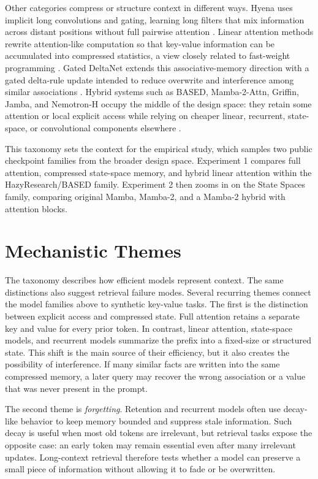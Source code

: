 \documentclass[10pt]{article}
\begin{document}
Other categories compress or structure context in different ways. Hyena uses
implicit long convolutions and gating, learning long filters that mix
information across distant positions without full pairwise attention
\cite{poli2023hyena}. Linear attention methods rewrite attention-like
computation so that key-value information can be accumulated into compressed
statistics, a view closely related to fast-weight programming
\cite{schlag2021fastweight}. Gated DeltaNet extends this associative-memory
direction with a gated delta-rule update intended to reduce overwrite and
interference among similar associations \cite{yang2024gateddelta}. Hybrid
systems such as BASED, Mamba-2-Attn, Griffin, Jamba, and Nemotron-H occupy the
middle of the design space: they retain some attention or local explicit
access while relying on cheaper linear, recurrent, state-space, or
convolutional components elsewhere
\cite{arora2024based,dao2024mamba2,de2024griffin,lieber2024jamba,nvidia2025nemotron}.

This taxonomy sets the context for the empirical study, which samples two
public checkpoint families from the broader design space. Experiment 1 compares
full attention, compressed state-space memory, and hybrid linear attention
within the HazyResearch/BASED family. Experiment 2 then zooms in on the State
Spaces family, comparing original Mamba, Mamba-2, and a Mamba-2 hybrid with
attention blocks.

\FloatBarrier
\section{Mechanistic Themes}
 
The taxonomy describes how efficient models represent context. The same
distinctions also suggest retrieval failure modes. Several recurring themes
connect the model families above to synthetic key-value tasks. The first
is the distinction between explicit access and compressed state. Full attention
retains a separate key and value for every prior token. In contrast, linear
attention, state-space models, and recurrent models summarize the prefix into a
fixed-size or structured state. This shift is the main source of their
efficiency, but it also creates the possibility of interference. If many
similar facts are written into the same compressed memory, a later query may
recover the wrong association or a value that was never present in the prompt.

The second theme is \textit{forgetting}. Retention and recurrent models often use
decay-like behavior to keep memory bounded and suppress stale information. Such decay is useful when most old tokens are irrelevant, but retrieval tasks expose the opposite case: an early token may remain essential even after many
irrelevant updates. Long-context retrieval therefore tests whether a model can
preserve a small piece of information without allowing it to fade or be
overwritten.
\end{document}

